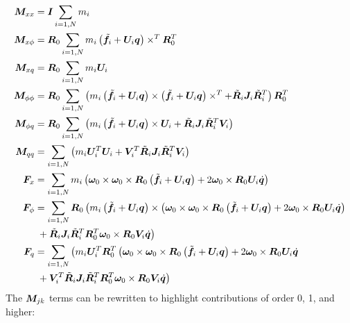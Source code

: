 \begin{subequations}
\begin{align}
	\bm{M}_{xx}	&= \bm{I} \sum_{i=1,N} m_i \\
	\bm{M}_{x\phi}	&= \bm{R}_0 \sum_{i=1,N} m_i \left( \tilde{\bm{f}}_i + \bm{U}_i \bm{q} \right)\times^T \bm{R}_0^T \\
	\bm{M}_{xq}	&= \bm{R}_0 \sum_{i=1,N} m_i \bm{U}_i \\
	\bm{M}_{\phi\phi}&= \bm{R}_0 \sum_{i=1,N} \left( 
		m_i \left( \tilde{\bm{f}}_i + \bm{U}_i \bm{q} \right)\times
		\left( \tilde{\bm{f}}_i + \bm{U}_i \bm{q} \right)\times^T
		+ \tilde{\bm{R}}_i \bm{J}_i \tilde{\bm{R}}_i^T
	 \right) \bm{R}_0^T \\
	\bm{M}_{\phi q}	&= \bm{R}_0 \sum_{i=1,N} \left( 
		m_i \left( \tilde{\bm{f}}_i + \bm{U}_i \bm{q} \right)\times \bm{U}_i
		+ \tilde{\bm{R}}_i \bm{J}_i \tilde{\bm{R}}_i^T \bm{V}_i
	 \right) \\
	\bm{M}_{qq}	&= \sum_{i=1,N} \left( 
		m_i \bm{U}_i^T \bm{U}_i
		+ \bm{V}_i^T \tilde{\bm{R}}_i \bm{J}_i \tilde{\bm{R}}_i^T \bm{V}_i
	 \right) \\
	\bm{F}_x		&= \sum_{i=1,N} m_i \left( 
		\bm{\omega}_0 \times \bm{\omega}_0 \times \bm{R}_0 \left( \tilde{\bm{f}_i} + \bm{U}_i \bm{q} \right)
		+ 2 \bm{\omega}_0 \times \bm{R}_0 \bm{U}_i \dot{\bm{q}} 
	 \right) \\
	\bm{F}_{\phi}	&= \sum_{i=1,N} \bm{R}_0 \left( 
		m_i \left( \tilde{\bm{f}_i} + \bm{U}_i \bm{q} \right)\times \left( 
			\bm{\omega}_0 \times \bm{\omega}_0 \times \bm{R}_0 \left( \tilde{\bm{f}_i} + \bm{U}_i \bm{q} \right)
			+ 2 \bm{\omega}_0 \times \bm{R}_0 \bm{U}_i \dot{\bm{q}}
		 \right)
	 \right. \nonumber \\
			& \left. 
		\mbox{} + \tilde{\bm{R}}_i \bm{J}_i \tilde{\bm{R}}_i^T \bm{R}_0^T \bm{\omega}_0 \times \bm{R}_0 \bm{V}_i \dot{\bm{q}}
	 \right) \\
	\bm{F}_q		&= \sum_{i=1,N} \left( 
		m_i \bm{U}_i^T \bm{R}_0^T \left( 
			\bm{\omega}_0 \times \bm{\omega}_0 \times \bm{R}_0 \left( \tilde{\bm{f}_i} + \bm{U}_i \bm{q} \right)
			+ 2 \bm{\omega}_0 \times \bm{R}_0 \bm{U}_i \dot{\bm{q}}
		 \right.
	 \right. \nonumber \\
			& \left. 
		\mbox{} + \bm{V}_i^T \tilde{\bm{R}}_i \bm{J}_i \tilde{\bm{R}}_i^T \bm{R}_0^T \bm{\omega}_0 \times \bm{R}_0 \bm{V}_i \dot{\bm{q}}
	 \right)
\end{align}
\end{subequations}
The $\bm{M}_{jk}$ terms can be rewritten to highlight contributions of order
0, 1, and higher:
